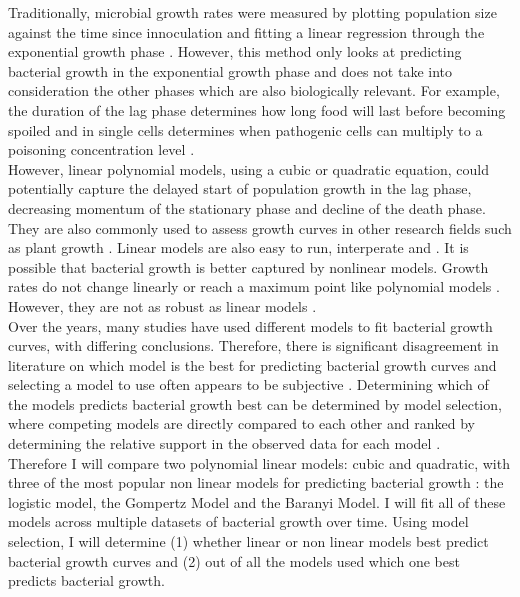 \documentclass[titlepage]{article}
\begin{document}
Traditionally, microbial growth rates were measured by plotting population size against the time since innoculation and fitting a linear regression through the exponential growth phase \cite{whiting1992quantitative, baranyi1994dynamic}. However, this method only looks at predicting bacterial growth in the exponential growth phase and  does not take into consideration the other phases which are also biologically relevant. For example, the duration of the lag phase determines how long food will last before becoming spoiled and in single cells determines when pathogenic cells can multiply to a poisoning concentration level  \cite{baranyi1994dynamic,baranyi2009parameter,olofsson2011modeling}. \\

However, linear polynomial models, using a cubic or quadratic equation, could potentially capture the delayed start of population growth in the lag phase, decreasing momentum of the stationary phase and decline of the death phase. They are also commonly used to assess growth curves in other research fields such as plant growth \cite{jane2019comparison}. Linear models are also easy to run, interperate and \cite{grimm2011nonlinear}. It is possible that bacterial growth is better captured by nonlinear models. Growth rates do not change linearly or reach a maximum  point like polynomial  models \cite{jane2019comparison}. However, they are not as robust as linear models \cite{buchanan1997simple}. \\

Over the years, many studies have used different models to fit bacterial growth curves, with differing conclusions. Therefore, there is significant disagreement in literature on which model is the best for predicting bacterial growth curves and selecting a model to use often appears to be subjective \cite{pla2015comparison}. 
Determining which of the models predicts bacterial growth best can be determined by model selection, where competing models are directly compared to each other and ranked by determining the relative support in the observed data for each model \cite{johnson2004model}. \\

Therefore I will compare two polynomial linear models: cubic and quadratic, with three of the most popular non linear models for predicting bacterial growth \cite{pla2015comparison}: the logistic model, the Gompertz Model and the Baranyi Model. I will fit all of these models across multiple datasets of bacterial growth over time. Using model selection, I will determine (1) whether linear or non linear models best predict bacterial growth curves and (2) out of all the models used which one best predicts bacterial growth.
\end{document}
